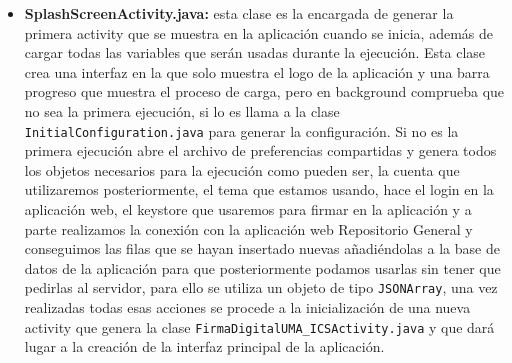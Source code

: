 \begin{itemize}
\item \textbf{SplashScreenActivity.java:} esta clase es la encargada de generar la primera activity que se muestra en la aplicación cuando se inicia, además de cargar todas las variables que serán usadas durante la ejecución. Esta clase crea una interfaz en la que solo muestra el logo de la aplicación y una barra progreso que muestra el proceso de carga, pero en background comprueba que no sea la primera ejecución, si lo es llama a la clase \lstinline{InitialConfiguration.java} para generar la configuración. Si no es la primera ejecución abre el archivo de preferencias compartidas y genera todos los objetos necesarios para la ejecución como pueden ser, la cuenta que utilizaremos posteriormente, el tema que estamos usando, hace el login en la aplicación web, el keystore que usaremos para firmar en la aplicación y a parte realizamos la conexión con la aplicación web Repositorio General y conseguimos las filas que se hayan insertado nuevas añadiéndolas a la base de datos de la aplicación para que posteriormente podamos usarlas sin tener que pedirlas al servidor, para ello se utiliza un objeto de tipo \lstinline{JSONArray}, una vez realizadas todas esas acciones se procede a la inicialización de una nueva activity que genera la clase \lstinline{FirmaDigitalUMA_ICSActivity.java} y que dará lugar a la creación de la interfaz principal de la aplicación.

\end{itemize}
